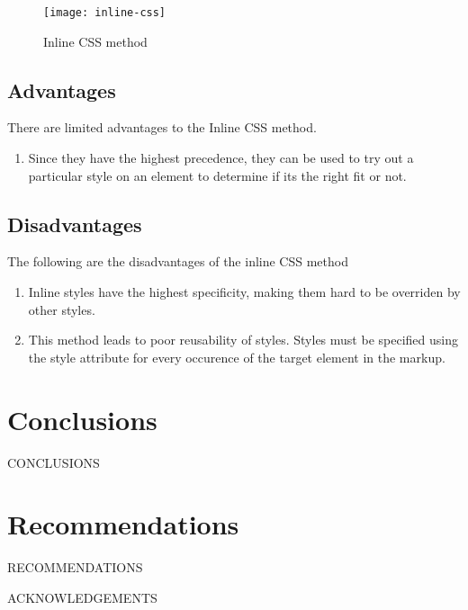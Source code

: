 \documentclass[12pt]{article}
\begin{document}
\vspace{0.5cm}

\begin{figure}[h]
\texttt{[image: inline-css]}
\centering
\caption{Inline CSS method}
\end{figure}

\subsection{Advantages}
There are limited advantages to the Inline CSS method.
\begin{enumerate}
	\item Since they have the highest precedence, they can be used to try out a particular style on an element to determine if its the right fit or not.
\end{enumerate}

\subsection{Disadvantages}
The following are the disadvantages of the inline CSS method
\begin{enumerate}
	\item Inline styles have the highest specificity, making them hard to be overriden by other styles.

	\item This method leads to poor reusability of styles. Styles must be specified using the style attribute for every occurence of the target element in the markup.
\end{enumerate}


\newpage

\section{Conclusions}
CONCLUSIONS
\newpage

\section{Recommendations}
RECOMMENDATIONS
\newpage



\newpage


ACKNOWLEDGEMENTS
\newpage


\end{document}
